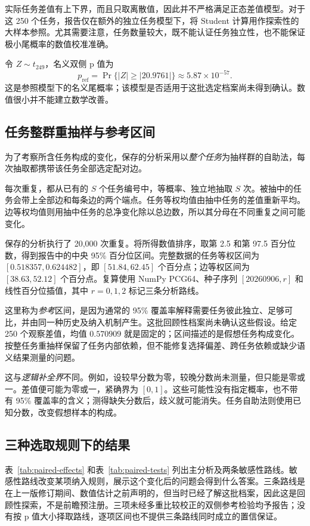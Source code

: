实际任务差值有上下界，而且只取离散值，因此并不严格满足正态差值模型。对于这 250 个任务，报告仅在额外的独立任务模型下，将 Student 计算用作探索性的大样本参照。尤其需要注意，任务数量较大，既不能认证任务独立性，也不能保证极小尾概率的数值校准准确。

令 $Z\sim t_{249}$，名义双侧 p 值为
\[
p_{\mathrm{ref}}=\Pr\{|Z|\geq |20.9761|\}
\approx5.87\times10^{-57}.
\]
这是参照模型下的名义尾概率；该模型是否适用于这批选定档案尚未得到确认。数值很小并不能建立数学改善。

\subsection{任务整群重抽样与参考区间}
\label{subsec:cluster-resampling}
为了考察所含任务构成的变化，保存的分析采用以\emph{整个任务}为抽样群的自助法\cite{scipybootstrap}，每次抽取都携带该任务全部选定配对边。

每次重复，都从已有的 $S$ 个任务编号中，等概率、独立地抽取 $S$ 次。被抽中的任务会带上全部边和每条边的两个端点。任务等权均值由抽中任务的差值重新平均。边等权均值则用抽中任务的总净变化除以总边数，所以其分母在不同重复之间可能变化。

保存的分析执行了 20,000 次重复。将所得数值排序，取第 2.5 和第 97.5 百分位数，得到报告中的中央 95\% 百分位区间。完整数据的任务等权区间为 $[0.518357,0.624482]$，即 $[51.84,62.45]$ 个百分点；边等权区间为 $[38.63,52.12]$ 个百分点。复算使用 NumPy PCG64、种子序列 $[20260906,r]$ 和线性百分位插值，其中 $r=0,1,2$ 标记三条分析路线。

这里称为\emph{参考}区间，是因为通常的 95\% 覆盖率解释需要任务彼此独立、足够可比，并由同一种历史及纳入机制产生。这批回顾性档案尚未确认这些假设。给定 250 个观察差值，均值 $0.570909$ 就是固定的；区间描述的是假想任务构成变化。按整任务重抽样保留了任务内部依赖，但不能修复选择偏差、跨任务依赖或缺少语义结果测量的问题。

这与\emph{逻辑补全界}不同。例如，设较早分数为零，较晚分数尚未测量，但只能是零或一。差值便可能为零或一，紧确界为 $[0,1]$。这些可能性没有指定概率，也不带有 95\% 覆盖率的含义；测得缺失分数后，歧义就可能消失。任务自助法则使用已知分数，改变假想样本的构成。

\subsection{三种选取规则下的结果}
\label{subsec:paired-results}
表~\ref{tab:paired-effects} 和表~\ref{tab:paired-tests} 列出主分析及两条敏感性路线。敏感性路线改变某项纳入规则，展示这个变化后的问题会得到什么答案。三条路线是在上一版修订期间、数值估计之前声明的，但当时已经了解这批档案，因此这是回顾性探索，不是前瞻预注册。三项未经多重比较校正的双侧参考检验均予报告；没有按 p 值大小择取路线，逐项区间也不提供三条路线同时成立的置信保证。

